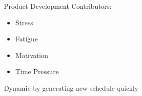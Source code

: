  \begin{frame}{Product Development}{}
    Contributors:
    \begin{itemize}
            \item{Stress}
            \item{Fatigue}
            \item{Motivation}
            \item{Time Pressure}
    \end{itemize}
    Dynamic by generating new schedule quickly
\end{frame}

